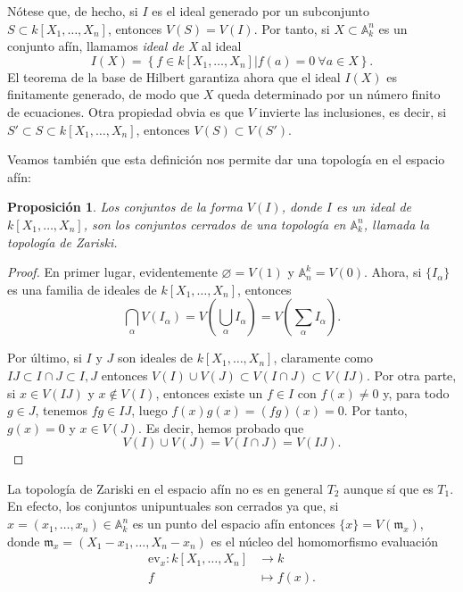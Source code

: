 \documentclass[12pt,a4paper]{article}
\newtheorem{prop}[thm]{Proposición}
\theoremstyle{definition} \newtheorem{defn}[thm]{Definición}
\theoremstyle{definition} \newtheorem{ejemplo}[thm]{Ejemplo}
\theoremstyle{definition} \newtheorem{ejercicio}[thm]{Ejercicio}
\theoremstyle{remark} \newtheorem*{obs}{Observación}
\def\AA{\mathbb{A}}
\def\mm{\mathfrak{m}}
\begin{document}
Nótese que, de hecho, si $I$ es el ideal generado por un subconjunto $S\subset k[X_1,\dots,X_n]$, entonces $V(S)=V(I)$. Por tanto, si $X\subset \AA_k^n$ es un conjunto afín, llamamos \emph{ideal de X} al ideal
\begin{equation*}
  I(X)=\left\{ f\in k[X_1,\dots,X_n] | f(a)=0 \ \forall a \in X \right\}.
\end{equation*}
El teorema de la base de Hilbert garantiza ahora que el ideal $I(X)$ es finitamente generado, de modo que $X$ queda determinado por un número finito de ecuaciones. Otra propiedad obvia es que $V$ invierte las inclusiones, es decir, si $S' \subset S\subset k[X_1,\dots,X_n]$, entonces $V(S)\subset V(S')$. 

Veamos también que esta definición nos permite dar una topología en el espacio afín:
\begin{prop}
  Los conjuntos de la forma $V(I)$, donde $I$ es un ideal de $k[X_1,\dots,X_n]$, son los conjuntos cerrados de una topología en $\AA_k^n$, llamada la \emph{topología de Zariski}.
\end{prop}

\begin{proof}
  En primer lugar, evidentemente $\varnothing=V(1)$ y $\AA^k_n=V(0)$. Ahora, si $\{I_{\alpha}\}$ es una familia de ideales de $k[X_1,\dots,X_n]$, entonces 
  \begin{equation*}
    \bigcap_{\alpha} V(I_{\alpha})=V\left( \bigcup_{\alpha}I_{\alpha} \right)=V\left( \sum_{\alpha}I_{\alpha} \right).
  \end{equation*}

  Por último, si $I$ y $J$ son ideales de $k[X_1,\dots,X_n]$, claramente como $IJ\subset I\cap J \subset I, J$ entonces $V(I)\cup V(J) \subset V(I\cap J) \subset V(IJ)$. Por otra parte, si $x\in V(IJ)$ y $x \not\in V(I)$, entonces existe un $f\in I$ con $f(x)\neq 0$ y, para todo $g\in J$, tenemos $fg\in IJ$, luego $f(x)g(x)=(fg)(x)=0$. Por tanto, $g(x)=0$ y $x\in V(J)$. Es decir, hemos probado que 
\begin{equation*}
  V(I)\cup V(J)=V(I\cap J)=V(IJ).
  \end{equation*}
\end{proof}

La topología de Zariski en el espacio afín no es en general $T_2$ aunque sí que es $T_1$. En efecto, los conjuntos unipuntuales son cerrados ya que, si $x=(x_1,\dots,x_n)\in \AA_k^n$ es un punto del espacio afín entonces $\{x\}=V(\mm_x)$, donde $\mm_x=(X_1-x_1,\dots,X_n-x_n)$ es el núcleo del homomorfismo evaluación
\begin{align*}
  \mathrm{ev}_x :k[X_1,\dots,X_n]&\longrightarrow k\\ 
    f &\longmapsto f(x). 
  \end{align*}
\end{document}
